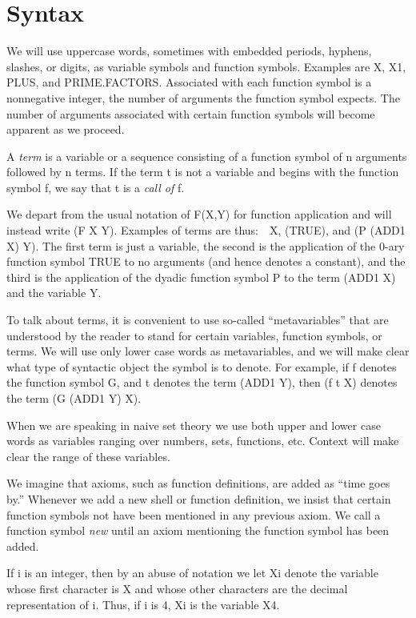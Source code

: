 \documentclass[10pt]{book}
\begin{document}
\section{Syntax}

\hrulefill 

We will use uppercase words, sometimes with embedded periods, hyphens, slashes, or digits,
as variable symbols and function symbols.  Examples are X, X1, PLUS, and PRIME.FACTORS.
Associated with each function symbol is a nonnegative integer, the number
of arguments the function symbol expects.  The number of arguments
associated with certain function symbols will become apparent as we proceed.

A \emph{term} is a variable or a sequence consisting of a function symbol
of n arguments followed by n terms.  If the term t is not a variable
and begins with the function symbol f, we say that t is a \emph{call of} f.

We depart from the usual notation of F(X,Y) for
function application and will instead write (F X Y).
Examples of terms are thus:~~X, (TRUE), and (P (ADD1 X) Y).  The first term
is just a variable, the second is the application of the 0-ary
function symbol TRUE to no arguments (and hence denotes a constant),
and the third is the application of the dyadic function symbol P to the
term (ADD1 X) and the variable Y.

To talk about terms, it is convenient  to use so-called
``metavariables'' that are understood by the reader to stand for certain
variables, function symbols, or terms.  We will use
only lower case words as metavariables,  and we will make clear 
what type of syntactic object the symbol is to denote. For example,  if
f  denotes the function symbol G, and
t   denotes the term (ADD1 Y), then (f t X)  denotes the term (G (ADD1 Y) X).

When we are speaking in naive set theory we use both upper and lower case
words as variables ranging over numbers, sets, functions, etc.  Context
will make clear the range of these variables.

We imagine  that axioms, such as function definitions, are added as
``time goes by.''  Whenever we add a new shell or function
definition, we insist that certain function symbols not have been 
mentioned in any previous axiom.   We call a function symbol
\emph{new} until an axiom mentioning the function symbol has been added.

If i is an integer, then by an abuse of notation we let
Xi denote the variable whose
first character is X and whose other characters are the
decimal representation of i.  Thus, if i is 4, Xi is the variable X4.
\end{document}
